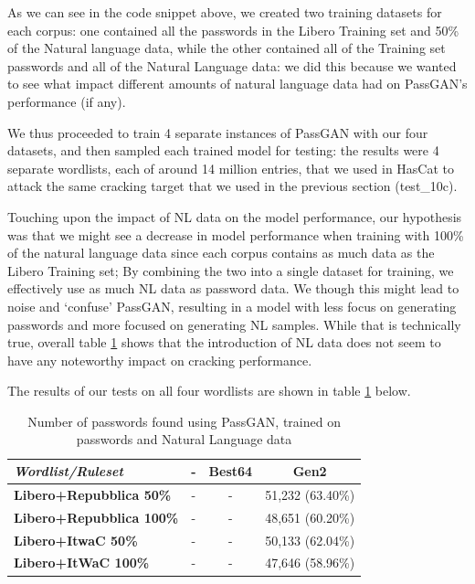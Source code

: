 As we can see in the code snippet above, we created two training datasets for each corpus: one contained all the passwords in the Libero Training set and 50\% of the Natural language data, while the other contained all of the Training set passwords and all of the Natural Language data: we did this because we wanted to see what impact different amounts of natural language data had on PassGAN's performance (if any).

We thus proceeded to train 4 separate instances of PassGAN with our four datasets, and then sampled each trained model for testing: the results were 4 separate wordlists, each of around 14 million entries, that we used in HasCat to attack the same cracking target that we used in the previous section (test\_10c).

Touching upon the impact of NL data on the model performance, our hypothesis was that we might see a decrease in model performance when training with 100\% of the natural language data since each corpus contains as much data as the Libero Training set; By combining the two into a single dataset for training, we effectively use as much NL data as password data.  We though this might lead to noise and ‘confuse’ PassGAN, resulting in a model with less focus on generating passwords and more focused on generating NL samples. While that is technically true, overall table \ref{tab:nl-results} shows that the introduction of NL data does not seem to have any noteworthy impact on cracking performance.

The results of our tests on all four wordlists are shown in table \ref{tab:nl-results} below.

\begin{table}[H]
\centering
\begin{tabular}{|l|c|c|c|}
\hline
 \textbf{\emph{Wordlist/Ruleset}} & \textbf{-} & \textbf{Best64} & \textbf{Gen2} \\ \hline
 \textbf{Libero+Repubblica 50\%} & - & - & 51,232 (63.40\%) \\ \hline
 \textbf{Libero+Repubblica 100\%} & - & - &  48,651 (60.20\%) \\ \hline
 \textbf{Libero+ItwaC 50\%} & - & - &  50,133 (62.04\%) \\ \hline
 \textbf{Libero+ItWaC 100\%} & - & - &  47,646 (58.96\%) \\ \hline
\end{tabular}
\caption{Number of passwords found using PassGAN, trained on passwords and Natural Language data}
\label{tab:nl-results}
\end{table}

